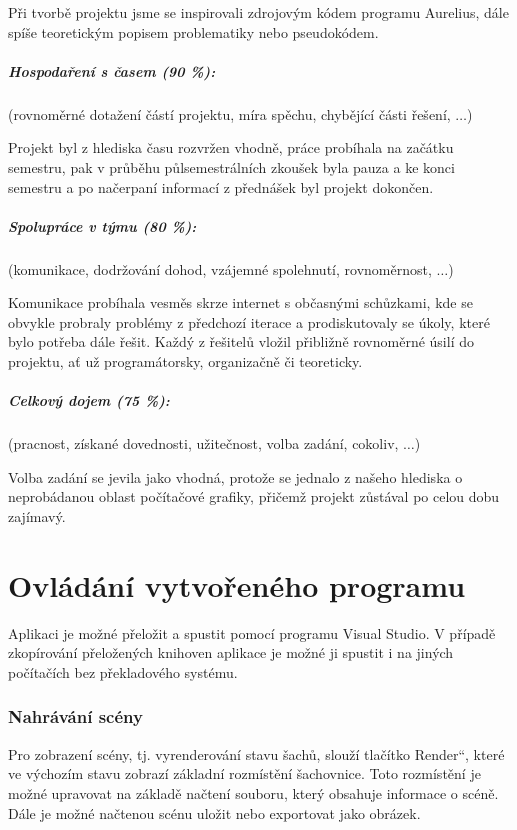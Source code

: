 \documentclass[12pt,a4paper,titlepage,final]{report}
\providecommand{\uv}[1]{\quotedblbase #1\textquotedblleft}
\begin{document}
Při tvorbě projektu jsme se inspirovali zdrojovým kódem programu Aurelius, dále spíše teoretickým popisem problematiky nebo pseudokódem.

\paragraph{Hospodaření s časem (90 \%):} (rovnoměrné dotažení částí projektu,
míra spěchu, chybějící části řešení, $\ldots$)

Projekt byl z hlediska času rozvržen vhodně, práce probíhala na začátku semestru, pak v průběhu půlsemestrálních zkoušek byla pauza a ke konci semestru a po načerpaní informací z přednášek byl projekt dokončen.

\paragraph{Spolupráce v týmu (80 \%):} (komunikace, dodržování dohod, vzájemné
spolehnutí, rovnoměrnost, $\ldots$)

Komunikace probíhala vesměs skrze internet s občasnými schůzkami, kde se obvykle probraly problémy z předchozí iterace a prodiskutovaly se úkoly, které bylo potřeba dále řešit. Každý z řešitelů vložil přibližně rovnoměrné úsilí do projektu, ať už programátorsky, organizačně či teoreticky.

\paragraph{Celkový dojem (75 \%):} (pracnost, získané dovednosti, užitečnost,
volba zadání, cokoliv, $\ldots$)


Volba zadání se jevila jako vhodná, protože se jednalo z našeho hlediska o neprobádanou oblast počítačové grafiky, přičemž projekt zůstával po celou dobu zajímavý.

\chapter{Ovládání vytvořeného programu}
Aplikaci je možné přeložit a spustit pomocí programu Visual Studio. V případě zkopírování přeložených knihoven aplikace je možné ji spustit i na jiných počítačích bez překladového systému.

\subsection{Nahrávání scény}
Pro zobrazení scény, tj. vyrenderování stavu šachů, slouží tlačítko \uv{Render}, které ve výchozím stavu zobrazí základní rozmístění šachovnice. Toto rozmístění je možné upravovat na základě načtení souboru, který obsahuje informace o scéně.
Dále je možné načtenou scénu uložit nebo exportovat jako obrázek.
\end{document}
